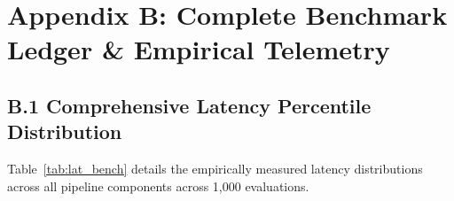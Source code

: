 \documentclass[10pt,a4paper]{article}
\begin{document}
\clearpage


\section*{Appendix B: Complete Benchmark Ledger \& Empirical Telemetry}

\subsection*{B.1 Comprehensive Latency Percentile Distribution}
Table~\ref{tab:lat_bench} details the empirically measured latency distributions across all pipeline components across 1,000 evaluations.
\end{document}
